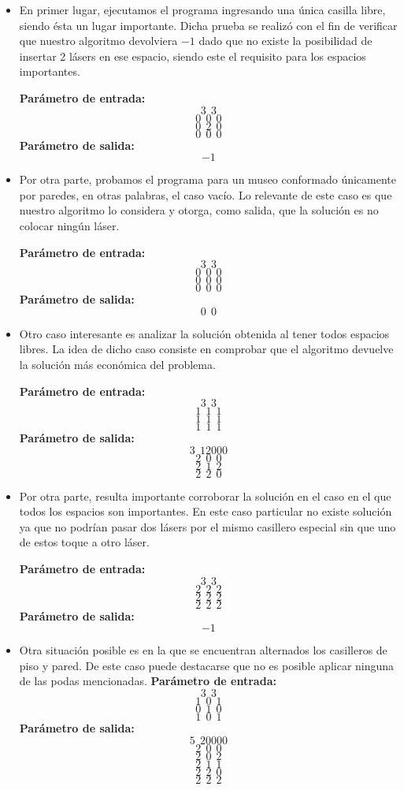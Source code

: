 \begin{itemize}
\item En primer lugar, ejecutamos el programa ingresando una única casilla libre, siendo ésta un lugar importante. Dicha prueba se realizó con el fin de verificar que nuestro algoritmo devolviera $-1$ dado que no existe la posibilidad de insertar 2 lásers en ese espacio, siendo este el requisito para los espacios importantes.\newline

\textbf{Parámetro de entrada:} 
$$3\ \ 3$$
$$0\ \ 0\ \ 0$$
$$0\ \ 2\ \ 0$$
$$0\ \ 0\ \ 0$$
\textbf{Parámetro de salida:} $$-1$$\newline
\item Por otra parte, probamos el programa para un museo conformado únicamente por paredes, en otras palabras, el caso vacío. Lo relevante de este caso es que nuestro algoritmo lo considera y otorga, como salida, que la solución es no colocar ningún láser.\newline




\textbf{Parámetro de entrada:} 
$$3\ \ 3$$
$$0\ \ 0\ \ 0$$
$$0\ \ 0\ \ 0$$
$$0\ \ 0\ \ 0$$
\textbf{Parámetro de salida:} $$0\ \ 0$$\newline
\item Otro caso interesante es analizar la solución obtenida al tener todos espacios libres. La idea de dicho caso consiste en comprobar que el algoritmo devuelve la solución más económica del problema.\newline

\textbf{Parámetro de entrada:} 
$$3\ \ 3$$
$$1\ \ 1\ \ 1$$
$$1\ \ 1\ \ 1$$
$$1\ \ 1\ \ 1$$
\textbf{Parámetro de salida:} 
$$3\ \ 12000$$
$$2\ \ 0\ \ 0$$
$$2\ \ 1\ \ 2$$
$$2\ \ 2\ \ 0$$
\newline

\item Por otra parte, resulta importante corroborar la solución en el caso en el que todos los espacios son importantes. En este caso particular no existe solución ya que no podrían pasar dos lásers por el mismo casillero especial sin que uno de estos toque a otro láser.\newline

\textbf{Parámetro de entrada:} 
$$3\ \ 3$$
$$2\ \ 2\ \ 2$$
$$2\ \ 2\ \ 2$$
$$2\ \ 2\ \ 2$$
\textbf{Parámetro de salida:} $$-1$$\newline

\item Otra situación posible es en la que se encuentran alternados los casilleros de piso y pared. De este caso puede destacarse que no es posible aplicar ninguna de las podas mencionadas.\newline
\textbf{Parámetro de entrada:} 
$$3\ \ 3$$
$$1\ \ 0\ \ 1$$
$$0\ \ 1\ \ 0$$
$$1\ \ 0\ \ 1$$
\textbf{Parámetro de salida:} 
$$5\ \ 20000$$
$$2\ \ 0\ \ 0$$
$$2\ \ 0\ \ 2$$
$$2\ \ 1\ \ 1$$
$$2\ \ 2\ \ 0$$
$$2\ \ 2\ \ 2$$


\end{itemize}
